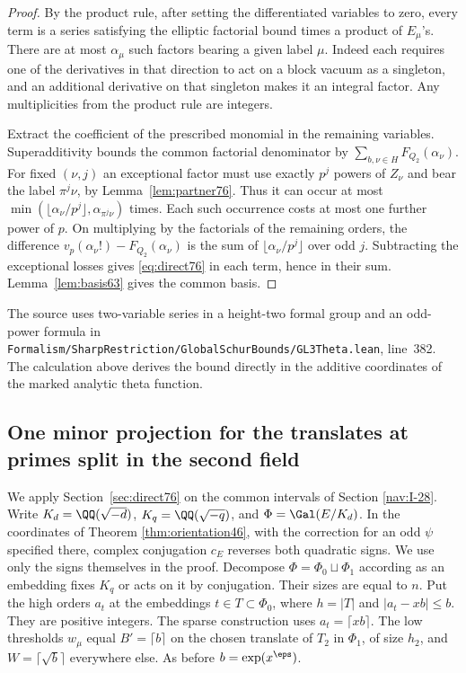 \documentclass[a4paper,11pt]{article}
\theoremstyle{definition}
\theoremstyle{remark}
\newcommand{\srcloc}[2]{{\small\nolinkurl{#1.lean}}, line~#2}
\numberwithin{equation}{section}
\begin{document}
\begin{proof}
By the product rule, after setting the differentiated variables
to zero, every term is a series satisfying the elliptic factorial
bound times a product of \(E_\mu\)'s. There are at most
\(\alpha_\mu\) such factors bearing a given label \(\mu\).
Indeed each requires one of the derivatives in that direction
to act on a block vacuum as a singleton, and an additional
derivative on that singleton makes it an integral factor.
Any multiplicities from the product rule are integers.

Extract the coefficient of the prescribed monomial in the
remaining variables. Superadditivity bounds the common
factorial denominator by \(\sum_{b,\nu\in H}F_{Q_2}(\alpha_\nu)\).
For fixed \((\nu,j)\) an exceptional factor must use exactly
\(p^j\) powers of \(Z_\nu\) and bear the label \(\pi^j\nu\),
by Lemma~\ref{lem:partner76}. Thus it can occur at most
\(\min(\lfloor\alpha_\nu/p^j\rfloor,\alpha_{\pi^j\nu})\) times.
Each such occurrence costs at most one further power of \(p\).
On multiplying by the factorials of the remaining orders,
the difference \(v_p(\alpha_\nu!)-F_{Q_2}(\alpha_\nu)\)
is the sum of \(\lfloor\alpha_\nu/p^j\rfloor\) over odd \(j\).
Subtracting the exceptional losses gives \eqref{eq:direct76}
in each term, hence in their sum. Lemma~\ref{lem:basis63}
gives the common basis.
\end{proof}

The source uses two-variable series in a height-two formal group and
an odd-power formula in
\srcloc{Formalism/SharpRestriction/GlobalSchurBounds/GL3Theta}{382}.
The calculation above derives the bound directly in the additive
coordinates of the marked analytic theta function.

\subsection{One minor projection for the translates at primes split in the second field}\label{nav:VI-01}
\label{sec:signal77}

We apply Section~\ref{sec:direct76} on the common intervals
of Section \ref{nav:I-28}.
Write \(K_d=\QQ(\sqrt{-d})\), \(K_q=\QQ(\sqrt{-q})\), and
\(\Phi=\Gal(E/K_d)\). In the coordinates of Theorem
\ref{thm:orientation46}, with the correction for an odd \(\psi\) specified there,
complex conjugation \(c_E\) reverses both quadratic signs.
We use only the signs themselves in the proof. Decompose
\(\Phi=\Phi_0\sqcup\Phi_1\) according as an embedding fixes
\(K_q\) or acts on it by conjugation. Their sizes are equal
to \(n\). Put the high orders \(a_t\) at the embeddings
\(t\in T\subset\Phi_0\), where \(h=|T|\) and
\(|a_t-xb|\le b\). They are positive integers. The sparse
construction uses \(a_t=\lceil xb\rceil\). The low thresholds
\(w_\mu\) equal \(B'=\lceil b\rceil\) on the chosen translate
of \(T_2\) in \(\Phi_1\), of size \(h_2\), and \(W=\lceil\sqrt
b\rceil\) everywhere else. As before \(b=\exp(x^\eps)\).
\end{document}
